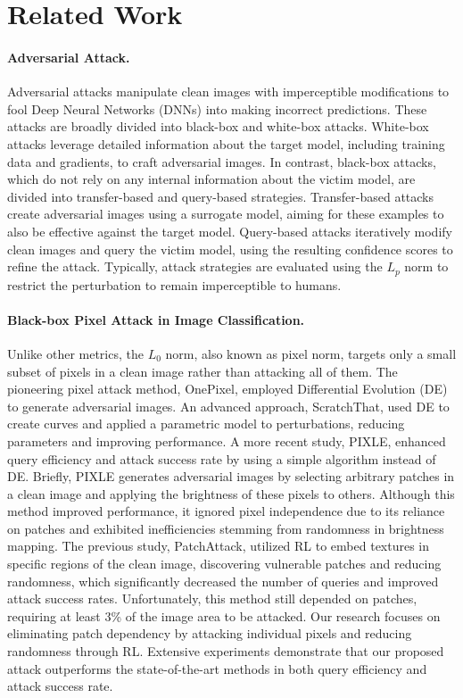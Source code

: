 \section{Related Work}
\paragraph{Adversarial Attack.}
Adversarial attacks manipulate clean images with imperceptible modifications to fool Deep Neural Networks (DNNs) into making incorrect predictions. These attacks are broadly divided into black-box and white-box attacks. White-box attacks leverage detailed information about the target model, including training data and gradients, to craft adversarial images. In contrast, black-box attacks, which do not rely on any internal information about the victim model, are divided into transfer-based and query-based strategies. Transfer-based attacks create adversarial images using a surrogate model, aiming for these examples to also be effective against the target model. Query-based attacks iteratively modify clean images and query the victim model, using the resulting confidence scores to refine the attack. Typically, attack strategies are evaluated using the $L_p$ norm to restrict the perturbation to remain imperceptible to humans\cite{fgsm, ffgsm, pgd, tpgd}.


\paragraph{Black-box Pixel Attack in Image Classification.}
Unlike other metrics, the $L_0$ norm, also known as pixel norm, targets only a small subset of pixels in a clean image rather than attacking all of them. The pioneering pixel attack method, OnePixel\cite{Onepixel}, employed Differential Evolution (DE) to generate adversarial images. An advanced approach, ScratchThat\cite{Scratch}, used DE to create curves and applied a parametric model to perturbations, reducing parameters and improving performance. A more recent study, PIXLE\cite{Pixel}, enhanced query efficiency and attack success rate by using a simple algorithm instead of DE. Briefly, PIXLE generates adversarial images by selecting arbitrary patches in a clean image and applying the brightness of these pixels to others. Although this method improved performance, it ignored pixel independence due to its reliance on patches and exhibited inefficiencies stemming from randomness in brightness mapping. The previous study, PatchAttack\cite{Patchattack}, utilized RL to embed textures in specific regions of the clean image, discovering vulnerable patches and reducing randomness, which significantly decreased the number of queries and improved attack success rates. Unfortunately, this method still depended on patches, requiring at least 3\% of the image area to be attacked. Our research focuses on eliminating patch dependency by attacking individual pixels and reducing randomness through RL. Extensive experiments demonstrate that our proposed attack outperforms the state-of-the-art methods in both query efficiency and attack success rate.

